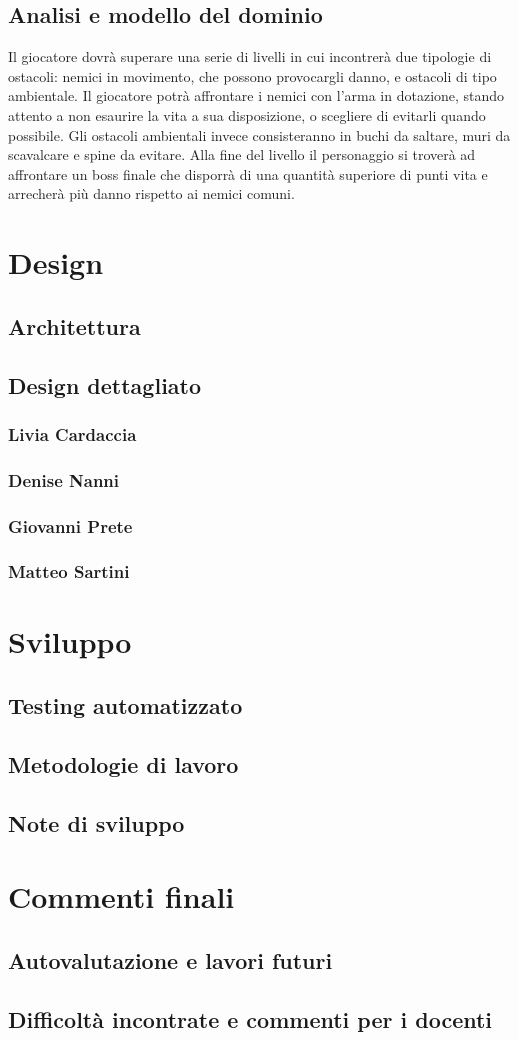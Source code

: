 \documentclass{article}
\begin{document}
\subsection{Analisi e modello del dominio}
Il giocatore dovrà superare una serie di livelli in cui incontrerà due tipologie di ostacoli: nemici in movimento, che possono provocargli danno, e ostacoli di tipo ambientale.
Il giocatore potrà affrontare i nemici con l'arma in dotazione, stando attento a non esaurire la vita a sua disposizione, o scegliere di evitarli quando possibile.
Gli ostacoli ambientali invece consisteranno in buchi da saltare, muri da scavalcare e spine da evitare.
Alla fine del livello il personaggio si troverà ad affrontare un boss finale che disporrà di una quantità superiore di punti vita e arrecherà più danno rispetto ai nemici comuni.

\section{Design}
\subsection{Architettura}
\subsection{Design dettagliato}
\subsubsection{Livia Cardaccia}
\subsubsection{Denise Nanni}
\subsubsection{Giovanni Prete}
\subsubsection{Matteo Sartini}
\section{Sviluppo}
\subsection{Testing automatizzato}
\subsection{Metodologie di lavoro}
\subsection{Note di sviluppo}
\section{Commenti finali}
\subsection{Autovalutazione e lavori futuri}
\subsection{Difficoltà incontrate e commenti per i docenti}
\end{document}

